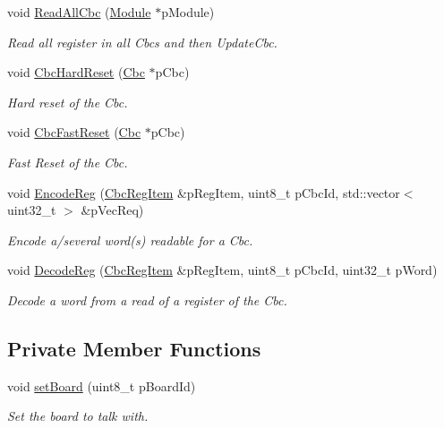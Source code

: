 \begin{CompactItemize}
void \hyperlink{class_ph2___hw_interface_1_1_cbc_interface_5a2e404039cef52b294cacfa7e667f49}{Read\-All\-Cbc} (\hyperlink{class_ph2___hw_description_1_1_module}{Module} $\ast$p\-Module)
\begin{CompactList}\small\item\em Read all register in all Cbcs and then Update\-Cbc. \item\end{CompactList}\item 
void \hyperlink{class_ph2___hw_interface_1_1_cbc_interface_0e9a7f5c0a444cb8ca14f3a90cd9e759}{Cbc\-Hard\-Reset} (\hyperlink{class_ph2___hw_description_1_1_cbc}{Cbc} $\ast$p\-Cbc)
\begin{CompactList}\small\item\em Hard reset of the Cbc. \item\end{CompactList}\item 
void \hyperlink{class_ph2___hw_interface_1_1_cbc_interface_e2166f5bd24481d88bdd015d1db08051}{Cbc\-Fast\-Reset} (\hyperlink{class_ph2___hw_description_1_1_cbc}{Cbc} $\ast$p\-Cbc)
\begin{CompactList}\small\item\em Fast Reset of the Cbc. \item\end{CompactList}\item 
void \hyperlink{class_ph2___hw_interface_1_1_cbc_interface_673d4cba39ab42870573baf00800dd62}{Encode\-Reg} (\hyperlink{struct_ph2___hw_description_1_1_cbc_reg_item}{Cbc\-Reg\-Item} \&p\-Reg\-Item, uint8\_\-t p\-Cbc\-Id, std::vector$<$ uint32\_\-t $>$ \&p\-Vec\-Req)
\begin{CompactList}\small\item\em Encode a/several word(s) readable for a Cbc. \item\end{CompactList}\item 
void \hyperlink{class_ph2___hw_interface_1_1_cbc_interface_f9f86fa0a60d5f2be2de715f97fd169d}{Decode\-Reg} (\hyperlink{struct_ph2___hw_description_1_1_cbc_reg_item}{Cbc\-Reg\-Item} \&p\-Reg\-Item, uint8\_\-t p\-Cbc\-Id, uint32\_\-t p\-Word)
\begin{CompactList}\small\item\em Decode a word from a read of a register of the Cbc. \item\end{CompactList}\end{CompactItemize}
\subsection*{Private Member Functions}
\begin{CompactItemize}
\item 
void \hyperlink{class_ph2___hw_interface_1_1_cbc_interface_39fac7185fffec4462d31d324ea9a54a}{set\-Board} (uint8\_\-t p\-Board\-Id)
\begin{CompactList}\small\item\em Set the board to talk with. \item\end{CompactList}\end{CompactItemize}
